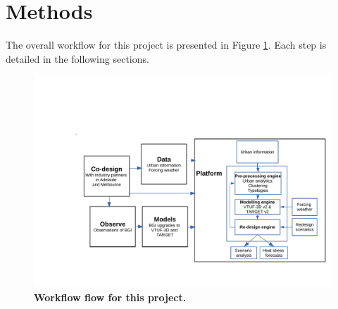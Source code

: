 \documentclass[final,3p,times,authoryear]{elsarticle}
\begin{document}
\section{Methods}\label{sec:methods}

The overall workflow for this project is presented in Figure \ref{fig:process}. Each step is detailed in the following sections.


\begin{figure}[ht]
\centering
\includegraphics[page=2,trim={46 280 100 10},clip,scale=0.45]{Figures/Processes.pdf}
\caption{\bf Workflow flow for this project.}
 \label{fig:process}
\end{figure} 

\end{document}
